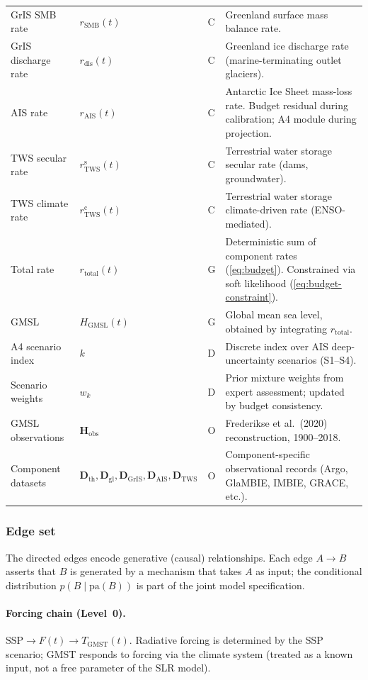 \documentclass[11pt]{article}
\newcommand{\GMSL}{\text{GMSL}}
\newcommand{\GMST}{\text{GMST}}
\begin{document}
\begin{table}[ht]
\begin{tabular}{lllp{7cm}}
GrIS SMB rate & $r_{\text{SMB}}(t)$ & C & Greenland surface mass balance rate. \\
GrIS discharge rate & $r_{\text{dis}}(t)$ & C & Greenland ice discharge rate (marine-terminating outlet glaciers). \\
AIS rate & $r_{\text{AIS}}(t)$ & C & Antarctic Ice Sheet mass-loss rate.  Budget residual during calibration; A4 module during projection. \\
TWS secular rate & $r_{\text{TWS}}^{\text{s}}(t)$ & C & Terrestrial water storage secular rate (dams, groundwater). \\
TWS climate rate & $r_{\text{TWS}}^{\text{c}}(t)$ & C & Terrestrial water storage climate-driven rate (ENSO-mediated). \\
\addlinespace
Total rate & $r_{\text{total}}(t)$ & G & Deterministic sum of component rates (\cref{eq:budget}).  Constrained via soft likelihood (\cref{eq:budget-constraint}). \\
GMSL & $H_{\GMSL}(t)$ & G & Global mean sea level, obtained by integrating $r_{\text{total}}$. \\
\addlinespace
A4 scenario index & $k$ & D & Discrete index over AIS deep-uncertainty scenarios (S1--S4). \\
Scenario weights & $w_k$ & D & Prior mixture weights from expert assessment; updated by budget consistency. \\
\addlinespace
GMSL observations & $\mathbf{H}_{\text{obs}}$ & O & Frederikse et al.\ (2020) reconstruction, 1900--2018. \\
Component datasets & $\mathbf{D}_{\text{th}}, \mathbf{D}_{\text{gl}}, \mathbf{D}_{\text{GrIS}}, \mathbf{D}_{\text{AIS}}, \mathbf{D}_{\text{TWS}}$ & O & Component-specific observational records (Argo, GlaMBIE, IMBIE, GRACE, etc.). \\
\bottomrule
\end{tabular}
\end{table}

\subsubsection{Edge set}

The directed edges encode generative (causal) relationships.  Each edge $A \to B$ asserts that $B$ is generated by a mechanism that takes $A$ as input; the conditional distribution $p(B \mid \mathrm{pa}(B))$ is part of the joint model specification.

\paragraph{Forcing chain (Level~0).}
$\text{SSP} \to F(t) \to T_{\GMST}(t)$.  Radiative forcing is determined by the SSP scenario; GMST responds to forcing via the climate system (treated as a known input, not a free parameter of the SLR model).
\end{document}
